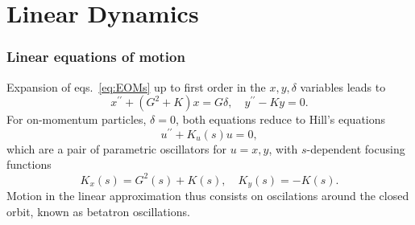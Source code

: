 \section{Linear Dynamics}
\subsubsection{Linear equations of motion}
Expansion of eqs.~\eqref{eq:EOMs} up to first order in the $x, y, \delta$ variables leads to \cite{sands}
    \begin{equation}
        x^{\prime\prime}+(G^2+K)x=G\delta, \quad
        y^{\prime\prime}-Ky=0.
        \label{eq:linearEOM}
    \end{equation}
    For on-momentum particles, $\delta=0$, both equations reduce to Hill's equations
    \begin{equation}
        u^{\prime\prime}+K_u(s)u = 0,
        \label{eq:Hill}
    \end{equation}
    which are a pair of parametric oscillators for $u=x,y$, with $s$-dependent focusing functions
         $$K_x(s) = G^2(s) + K(s), \quad K_y(s) = - K(s).$$
Motion in the linear approximation thus consists on oscilations around the closed orbit, known as betatron oscillations.
